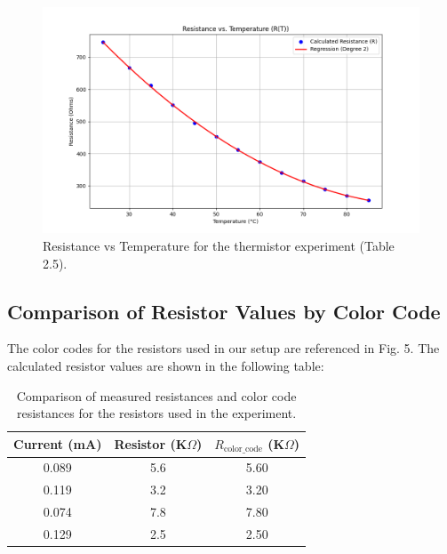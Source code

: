 \documentclass[journal]{IEEEtran}
\begin{document}
\begin{figure}[H]
    \centering
    \includegraphics[width=\linewidth]{output_plots/Resistance_vs_Temperature.png}
    \caption{Resistance vs Temperature for the thermistor experiment (Table 2.5).}
\end{figure}

\subsection{Comparison of Resistor Values by Color Code}
The color codes for the resistors used in our setup are referenced in Fig. 5. The calculated resistor values are shown in the following table:

\begin{table}[H]
\centering
\begin{tabular}{ccc}
\hline
Current (mA) & Resistor (K$\Omega$) & $R_{\text{color\_code}}$ (K$\Omega$) \\
\hline
0.089 & 5.6 & 5.60 \\
0.119 & 3.2 & 3.20 \\
0.074 & 7.8 & 7.80 \\
0.129 & 2.5 & 2.50 \\
\hline
\end{tabular}
\caption{Comparison of measured resistances and color code resistances for the resistors used in the experiment.}
\end{table}
\end{document}
